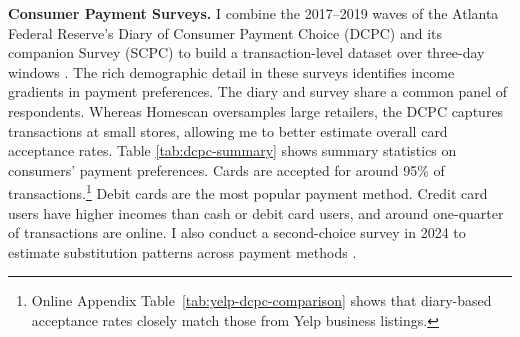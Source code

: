 \documentclass[main.tex]{subfiles}
\begin{document}
\noindent \textbf{Consumer Payment Surveys.} I combine the 2017--2019 waves of the Atlanta Federal Reserve's Diary of Consumer Payment Choice (DCPC) and its companion Survey (SCPC) to build a transaction-level dataset over three-day windows \parencite{Greene.Stavins2021}.
The rich demographic detail in these surveys identifies income gradients in payment preferences.
The diary and survey share a common panel of respondents. 
Whereas Homescan oversamples large retailers, the DCPC captures transactions at small stores, allowing me to better estimate overall card acceptance rates.
Table \ref{tab:dcpc-summary} shows summary statistics on consumers' payment preferences.
Cards are accepted for around 95\% of transactions.\footnote{
    Online Appendix Table~\ref{tab:yelp-dcpc-comparison} shows that diary-based acceptance rates closely match those from Yelp business listings.
}
Debit cards are the most popular payment method.
Credit card users have higher incomes than cash or debit card users, and around one-quarter of transactions are online.
I also conduct a second-choice survey in 2024 to estimate substitution patterns across payment methods \parencite{Berry.etal2004}.

\begin{table}
    \small
        \caption{Summary statistics by consumer type in the Diary of Consumer Payment Choice (DCPC)}
        \label{tab:dcpc-summary}
        \footnotesize
        \begin{center}
        
    \end{center}

\end{table}
\end{document}
